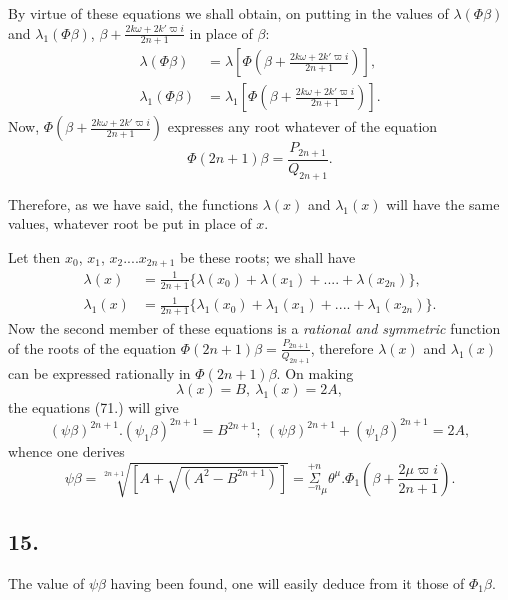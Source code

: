 \documentclass{article}
\begin{document}
By virtue of these equations we shall obtain, on putting in the values of $\lambda(\Phi\beta)$ and $\lambda_{1}(\Phi\beta)$, $\beta+\frac{2k\omega+2k'\varpi i}{2n+1}$ in place of $\beta$:
\[ \begin{aligned}
\lambda(\Phi\beta)&=\lambda\left[\Phi\left(\beta+\frac{2k\omega+2k'\varpi i}{2n+1}\right)\right],\\
\lambda_{1}(\Phi\beta)&=\lambda_{1}\left[\Phi\left(\beta+\frac{2k\omega+2k'\varpi i}{2n+1}\right)\right].
\end{aligned} \]
Now, $\Phi\left(\beta+\frac{2k\omega+2k'\varpi i}{2n+1}\right)$ expresses any root whatever of the equation
\[ \Phi(2n+1)\beta=\frac{P_{2n+1}}{Q_{2n+1}}. \]

Therefore, as we have said, the functions $\lambda(x)$ and $\lambda_{1}(x)$ will have the same values, whatever root be put in place of $x$.

Let then $x_{0}$, $x_{1}$, $x_{2}....x_{2n+1}$ be these roots; we shall have
\[ \begin{aligned}
\lambda(x)&=\frac{1}{2n+1}\{\lambda(x_{0})+\lambda(x_{1})+....+\lambda(x_{2n})\},\\
\lambda_{1}(x)&=\frac{1}{2n+1}\{\lambda_{1}(x_{0})+\lambda_{1}(x_{1})+....+\lambda_{1}(x_{2n})\}.
\end{aligned} \]
Now the second member of these equations is a \emph{rational and symmetric} function of the roots of the equation $\Phi(2n+1)\beta=\frac{P_{2n+1}}{Q_{2n+1}}$, therefore $\lambda(x)$ and $\lambda_{1}(x)$ can be expressed rationally in $\Phi(2n+1)\beta$. On making
\[ \lambda(x)=B,\ \lambda_{1}(x)=2A, \]
the equations (71.) will give
\[ (\psi\beta)^{2n+1}.(\psi_{1}\beta)^{2n+1}=B^{2n+1};\ (\psi\beta)^{2n+1}+(\psi_{1}\beta)^{2n+1}=2A, \]
whence one derives
\[ \psi\beta=\sqrt[2n+1]{[A+\sqrt{(A^{2}-B^{2n+1})}]}=\overset{+n}{\underset{-n}{\Sigma}}_{\mu}\theta^{\mu}.\Phi_{1}\left(\beta+\frac{2\mu\varpi i}{2n+1}\right). \tag{75.} \]

\subsection*{15.}

The value of $\psi\beta$ having been found, one will easily deduce from it those of $\Phi_{1}\beta$.
\end{document}
